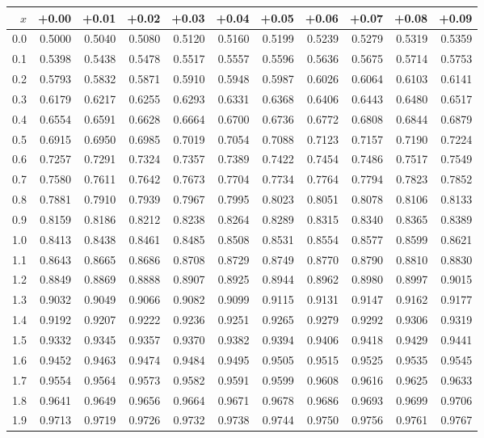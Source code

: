 \begin{table}[h]
\begin{center}
\small
\begin{tabular}{|r|rrrrrrrrrr|}
\hline
$x$&+0.00&+0.01&+0.02&+0.03&+0.04&+0.05&+0.06&+0.07&+0.08&+0.09\\
\hline
0.0&0.5000&0.5040&0.5080&0.5120&0.5160&0.5199&0.5239&0.5279&0.5319&0.5359\\
0.1&0.5398&0.5438&0.5478&0.5517&0.5557&0.5596&0.5636&0.5675&0.5714&0.5753\\
0.2&0.5793&0.5832&0.5871&0.5910&0.5948&0.5987&0.6026&0.6064&0.6103&0.6141\\
0.3&0.6179&0.6217&0.6255&0.6293&0.6331&0.6368&0.6406&0.6443&0.6480&0.6517\\
0.4&0.6554&0.6591&0.6628&0.6664&0.6700&0.6736&0.6772&0.6808&0.6844&0.6879\\
0.5&0.6915&0.6950&0.6985&0.7019&0.7054&0.7088&0.7123&0.7157&0.7190&0.7224\\
0.6&0.7257&0.7291&0.7324&0.7357&0.7389&0.7422&0.7454&0.7486&0.7517&0.7549\\
0.7&0.7580&0.7611&0.7642&0.7673&0.7704&0.7734&0.7764&0.7794&0.7823&0.7852\\
0.8&0.7881&0.7910&0.7939&0.7967&0.7995&0.8023&0.8051&0.8078&0.8106&0.8133\\
0.9&0.8159&0.8186&0.8212&0.8238&0.8264&0.8289&0.8315&0.8340&0.8365&0.8389\\
1.0&0.8413&0.8438&0.8461&0.8485&0.8508&0.8531&0.8554&0.8577&0.8599&0.8621\\
1.1&0.8643&0.8665&0.8686&0.8708&0.8729&0.8749&0.8770&0.8790&0.8810&0.8830\\
1.2&0.8849&0.8869&0.8888&0.8907&0.8925&0.8944&0.8962&0.8980&0.8997&0.9015\\
1.3&0.9032&0.9049&0.9066&0.9082&0.9099&0.9115&0.9131&0.9147&0.9162&0.9177\\
1.4&0.9192&0.9207&0.9222&0.9236&0.9251&0.9265&0.9279&0.9292&0.9306&0.9319\\
1.5&0.9332&0.9345&0.9357&0.9370&0.9382&0.9394&0.9406&0.9418&0.9429&0.9441\\
1.6&0.9452&0.9463&0.9474&0.9484&0.9495&0.9505&0.9515&0.9525&0.9535&0.9545\\
1.7&0.9554&0.9564&0.9573&0.9582&0.9591&0.9599&0.9608&0.9616&0.9625&0.9633\\
1.8&0.9641&0.9649&0.9656&0.9664&0.9671&0.9678&0.9686&0.9693&0.9699&0.9706\\
1.9&0.9713&0.9719&0.9726&0.9732&0.9738&0.9744&0.9750&0.9756&0.9761&0.9767\\

\end{tabular}
\end{center}
\end{table}
